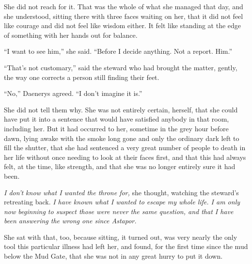 She did not reach for it. That was the whole of what she managed that day, and she understood, sitting there with three faces waiting on her, that it did not feel like courage and did not feel like wisdom either. It felt like standing at the edge of something with her hands out for balance.

“I want to see him,” she said. “Before I decide anything. Not a report. Him.”

“That’s not customary,” said the steward who had brought the matter, gently, the way one corrects a person still finding their feet.

“No,” Daenerys agreed. “I don’t imagine it is.”

She did not tell them why. She was not entirely certain, herself, that she could have put it into a sentence that would have satisfied anybody in that room, including her. But it had occurred to her, sometime in the grey hour before dawn, lying awake with the smoke long gone and only the ordinary dark left to fill the shutter, that she had sentenced a very great number of people to death in her life without once needing to look at their faces first, and that this had always felt, at the time, like strength, and that she was no longer entirely sure it had been.

\textit{I don’t know what I wanted the throne for,} she thought, watching the steward’s retreating back. \textit{I have known what I wanted to escape my whole life. I am only now beginning to suspect those were never the same question, and that I have been answering the wrong one since Astapor.}

She sat with that, too, because sitting, it turned out, was very nearly the only tool this particular illness had left her, and found, for the first time since the mud below the Mud Gate, that she was not in any great hurry to put it down.